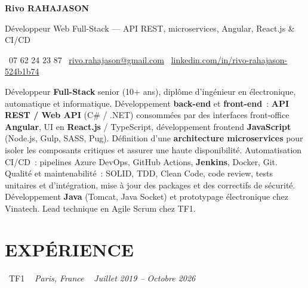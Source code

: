 \documentclass[10pt,a4paper]{article}
\begin{document}
\begin{center}
{\Huge \textbf{\color{ink}Rivo RAHAJASON}}

\vspace{4pt}

{\large \color{primary} Développeur Web Full-Stack --- API REST, microservices, Angular, React.js \& CI/CD}

\vspace{6pt}

\color{darkgray} \faPhone\  07 62 24 23 87 \quad
\color{darkgray} \faEnvelope\ \href{mailto:rivo.rahajason@gmail.com}{rivo.rahajason@gmail.com} \quad
\color{darkgray} \faLinkedin\ \href{https://linkedin.com/in/rivo-rahajason-524b1b74}{linkedin.com/in/rivo-rahajason-524b1b74}

\vspace{10pt}

\begin{minipage}{\textwidth}
\small\color{darkgray}
Développeur \textbf{Full-Stack} senior (10+ ans), diplôme d'ingénieur en électronique, automatique et informatique. Développement \textbf{back-end} et \textbf{front-end}~: \textbf{API REST / Web API} (C\# / .NET) consommées par des interfaces front-office \textbf{Angular}, UI en \textbf{React.js} / TypeScript, développement frontend \textbf{JavaScript} (Node.js, Gulp, SASS, Pug). Définition d'une \textbf{architecture microservices} pour isoler les composants critiques et assurer une haute disponibilité. Automatisation CI/CD~: pipelines Azure DevOps, GitHub Actions, \textbf{Jenkins}, Docker, Git. Qualité et maintenabilité~: SOLID, TDD, Clean Code, code review, tests unitaires et d'intégration, mise à jour des packages et des correctifs de sécurité. Développement \textbf{Java} (Tomcat, Java Socket) et prototypage électronique chez Vinatech. Lead technique en Agile Scrum chez TF1.
\end{minipage}

\vspace{16pt}
\end{center}

\section*{EXPÉRIENCE}

\noindent\textcolor{primary}{ \faBuilding\ TF1} \quad
\textit{ \small \textcolor{darkgray}{ \faMapMarker\ } Paris, France } \hfill
\textit{ \small \textcolor{darkgray}{ \faCalendar\ } Juillet 2019 -- Octobre 2026 }
\end{document}
